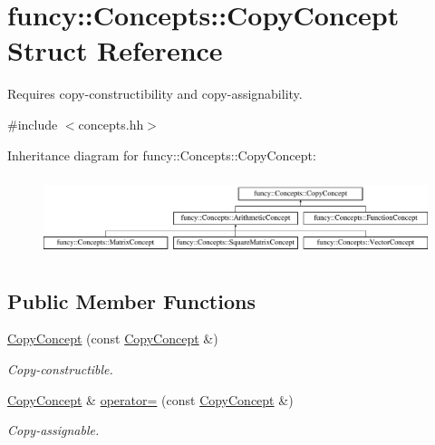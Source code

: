 \hypertarget{structfuncy_1_1Concepts_1_1CopyConcept}{\section{funcy\-:\-:Concepts\-:\-:Copy\-Concept Struct Reference}
\label{structfuncy_1_1Concepts_1_1CopyConcept}
}


Requires copy-\/constructibility and copy-\/assignability.  




{\ttfamily \#include $<$concepts.\-hh$>$}

Inheritance diagram for funcy\-:\-:Concepts\-:\-:Copy\-Concept\-:\begin{figure}[H]
\begin{center}
\leavevmode
\includegraphics[height=2.343096cm]{structfuncy_1_1Concepts_1_1CopyConcept}
\end{center}
\end{figure}
\subsection*{Public Member Functions}
\begin{DoxyCompactItemize}
\item 
\hyperlink{structfuncy_1_1Concepts_1_1CopyConcept_ace890b2949d1c6cc86269f469932708e}{Copy\-Concept} (const \hyperlink{structfuncy_1_1Concepts_1_1CopyConcept}{Copy\-Concept} \&)
\begin{DoxyCompactList}\small\item\em Copy-\/constructible. \end{DoxyCompactList}\item 
\hyperlink{structfuncy_1_1Concepts_1_1CopyConcept}{Copy\-Concept} \& \hyperlink{structfuncy_1_1Concepts_1_1CopyConcept_a7ea36606b4128c3e5cd090aefb368079}{operator=} (const \hyperlink{structfuncy_1_1Concepts_1_1CopyConcept}{Copy\-Concept} \&)
\begin{DoxyCompactList}\small\item\em Copy-\/assignable. \end{DoxyCompactList}\end{DoxyCompactItemize}


